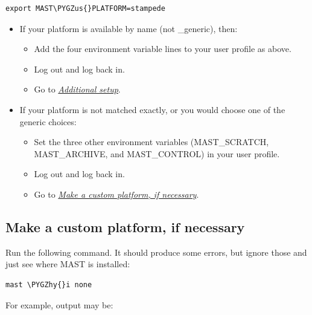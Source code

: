 \documentclass[letterpaper,10pt,english]{sphinxmanual}
\def\PYGZus{\char`\_}
\def\PYGZhy{\char`\-}
\begin{document}
\begin{Verbatim}[commandchars=\\\{\}]
export MAST\PYGZus{}PLATFORM=stampede
\end{Verbatim}
\begin{itemize}
\item {} 
If your platform is available by name (not \_generic), then:
\begin{itemize}
\item {} 
Add the four environment variable lines to your user profile as above.

\item {} 
Log out and log back in.

\item {} 
Go to {\hyperref[1_0_installation:additional-setup]{\emph{Additional setup}}}.

\end{itemize}

\item {} 
If your platform is not matched exactly, or you would choose one of the generic choices:
\begin{itemize}
\item {} 
Set the three other environment variables (MAST\_SCRATCH, MAST\_ARCHIVE, and MAST\_CONTROL) in your user profile.

\item {} 
Log out and log back in.

\item {} 
Go to {\hyperref[1_0_installation:make-custom-platform]{\emph{Make a custom platform, if necessary}}}.

\end{itemize}

\end{itemize}


\subsection{Make a custom platform, if necessary}
\label{1_0_installation:make-a-custom-platform-if-necessary}\label{1_0_installation:make-custom-platform}
Run the following command. It should produce some errors, but ignore those and just see where MAST is installed:

\begin{Verbatim}[commandchars=\\\{\}]
mast \PYGZhy{}i none
\end{Verbatim}

For example, output may be:
\end{document}
